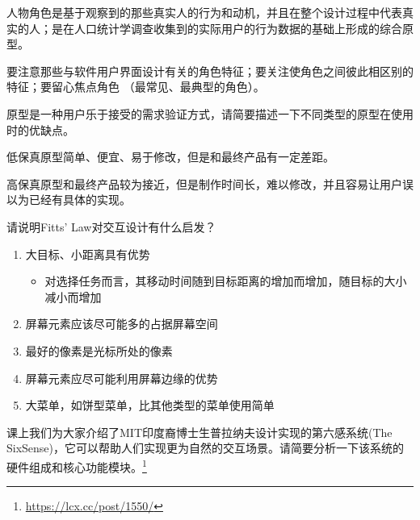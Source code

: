 \begin{solution}
人物角色是基于观察到的那些真实人的行为和动机，并且在整个设计过程中代表真实的人；是在人口统计学调查收集到的实际用户的行为数据的基础上形成的综合原型。

要注意那些与软件用户界面设计有关的角色特征；要关注使角色之间彼此相区别的特征；要留心焦点角色 （最常见、最典型的角色）。
\end{solution}



\begin{problem}
原型是一种用户乐于接受的需求验证方式，请简要描述一下不同类型的原型在使用时的优缺点。
\end{problem}

\begin{solution}
低保真原型简单、便宜、易于修改，但是和最终产品有一定差距。

高保真原型和最终产品较为接近，但是制作时间长，难以修改，并且容易让用户误以为已经有具体的实现。
\end{solution}



\begin{problem}
请说明Fitts' Law对交互设计有什么启发？
\end{problem}

\begin{solution}
\begin{enumerate}[label=\arabic*.]
    \item 大目标、小距离具有优势
    \vspace{-0.4em}
    \begin{itemize}
        \item 对选择任务而言，其移动时间随到目标距离的增加而增加，随目标的大小减小而增加
    \end{itemize}
    \item 屏幕元素应该尽可能多的占据屏幕空间
    \item 最好的像素是光标所处的像素
    \item 屏幕元素应尽可能利用屏幕边缘的优势
    \item 大菜单，如饼型菜单，比其他类型的菜单使用简单
\end{enumerate}
\end{solution}



\begin{problem}
课上我们为大家介绍了MIT印度裔博士生普拉纳夫设计实现的第六感系统(The SixSense)，它可以帮助人们实现更为自然的交互场景。请简要分析一下该系统的硬件组成和核心功能模块。\footnote{\url{https://lcx.cc/post/1550/}}
\end{problem}

